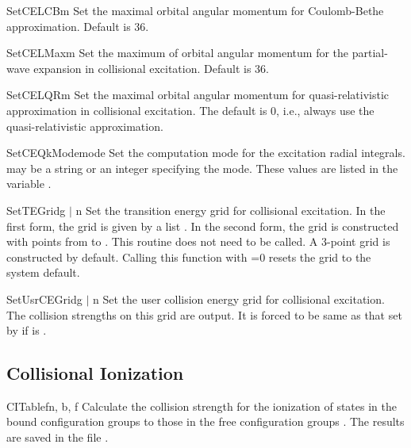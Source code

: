 \begin{fundesc}{SetCELCB}{m}
Set the maximal orbital angular momentum for Coulomb-Bethe approximation.
Default is 36.
\end{fundesc}

\begin{fundesc}{SetCELMax}{m}
Set the maximum of orbital angular momentum for the partial-wave expansion in
collisional excitation. Default is 36.
\end{fundesc}

\begin{fundesc}{SetCELQR}{m}
Set the maximal orbital angular momentum for quasi-relativistic approximation
in collisional excitation. The default is 0, i.e., always use the
quasi-relativistic approximation.
\end{fundesc}

\begin{fundesc}{SetCEQkMode}{mode}
Set the computation mode for the excitation radial integrals.  may
be a string or an integer specifying the mode. These values are listed in the
variable .
\end{fundesc}

\begin{fundesc}{SetTEGrid}{g $\mid$ n}
Set the transition energy grid for collisional excitation. In the first form,
the grid is given by a list . In the second form, the grid is constructed
with  points from   to . This routine does not need to be
called. A 3-point grid is constructed by default. Calling this function with
=0 resets the grid to the system default. 
\end{fundesc}

\begin{fundesc}{SetUsrCEGrid}{g $\mid$ n}
Set the user collision energy grid for collisional excitation. The collision
strengths on this grid are output. It is forced to be same as that set by
 if  is .
\end{fundesc}



\subsection{Collisional Ionization}

\begin{fundesc}{CITable}{fn, b, f}
Calculate the collision strength for the ionization of states in the bound
configuration groups  to those in the free configuration groups
. The results are saved in the file .
\end{fundesc}

